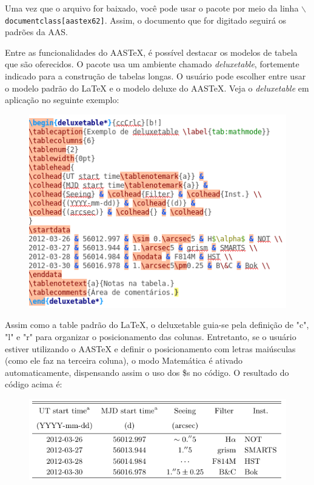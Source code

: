\documentclass[12pt]{article}
\begin{document}
			Uma vez que o arquivo for baixado, você pode usar o pacote por meio da linha \texttt{$\backslash$documentclass[aastex62]}. Assim, o documento que for digitado seguirá os padrões da AAS.
			
			Entre as funcionalidades do AASTeX, é possível destacar os modelos de tabela que são oferecidos. O pacote usa um ambiente chamado \textit{deluxetable}, fortemente indicado para a construção de tabelas longas. O usuário pode escolher entre usar o modelo padrão do LaTeX e o modelo deluxe do AASTeX. Veja o \textit{deluxetable} em aplicação no seguinte exemplo:
			
			\begin{figure}[h]
				\begin{center}
					\includegraphics[scale=0.6]{tabelaAASTEX.png}
				\end{center}
			\end{figure}
		
			Assim como a table padrão do LaTeX, o deluxetable guia-se pela definição de "c", "l" e "r" para organizar o posicionamento das colunas. Entretanto, se o usuário estiver utilizando o AASTeX e definir o posicionamento com letras maiúsculas (como ele faz na terceira coluna), o modo Matemática é ativado automaticamente, dispensando assim o uso dos \$s no código. O resultado do código acima é:
			
			\begin{figure}[h]
				\begin{center}
					\includegraphics[scale=0.4]{rtabelaAASTEX.png}
				\end{center}
			\end{figure}
			\newpage
			
\end{document}

